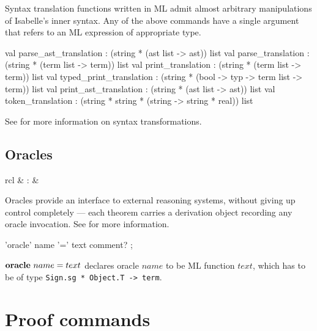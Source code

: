 Syntax translation functions written in ML admit almost arbitrary
manipulations of Isabelle's inner syntax.  Any of the above commands have a
single  argument that refers to an ML expression of
appropriate type.

\begin{ttbox}
val parse_ast_translation   : (string * (ast list -> ast)) list
val parse_translation       : (string * (term list -> term)) list
val print_translation       : (string * (term list -> term)) list
val typed_print_translation :
  (string * (bool -> typ -> term list -> term)) list
val print_ast_translation   : (string * (ast list -> ast)) list
val token_translation       :
  (string * string * (string -> string * real)) list
\end{ttbox}
See \cite[\S8]{isabelle-ref} for more information on syntax transformations.


\subsection{Oracles}

\begin{matharray}{rcl}
   & : &  \\
\end{matharray}

Oracles provide an interface to external reasoning systems, without giving up
control completely --- each theorem carries a derivation object recording any
oracle invocation.  See \cite[\S6]{isabelle-ref} for more information.

\begin{rail}
  'oracle' name '=' text comment?
  ;
\end{rail}

\begin{descr}
\item [${\mathord{\mathbf{oracle}}}~name=text$] declares oracle $name$ to be ML
  function $text$, which has to be of type
  \texttt{Sign.sg~*~Object.T~->~term}.
\end{descr}


\section{Proof commands}

